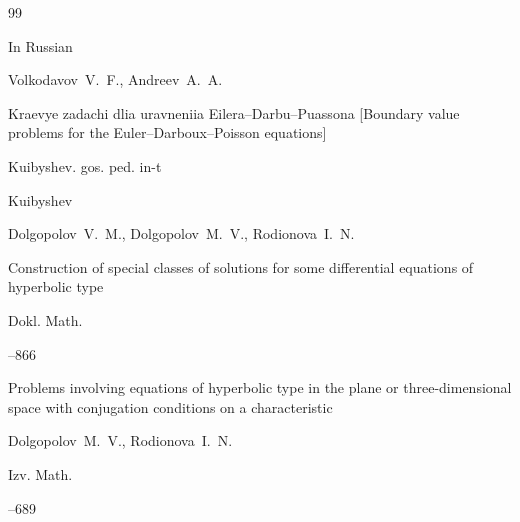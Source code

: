 \begin{thebibliography}{99}






\lang In Russian

\by Volkodavov~V.~F., Andreev~A.~A.

\book Kraevye zadachi dlia uravneniia Eilera--Darbu--Puassona \rm [Boundary value problems for the Euler--Darboux--Poisson equations]

\publ Kuibyshev. gos. ped. in-t

\publaddr Kuibyshev








\by Dolgopolov~V.~M., Dolgopolov~M.~V., Rodionova~I.~N.

\paper Construction of special classes of solutions for some differential equations of hyperbolic type

\jour Dokl. Math.



--866










\paper Problems involving equations of hyperbolic type in the plane or three-dimensional space with conjugation conditions on a characteristic

\by Dolgopolov~M.~V., Rodionova~I.~N.

\jour Izv. Math.




--689




\end{thebibliography}
